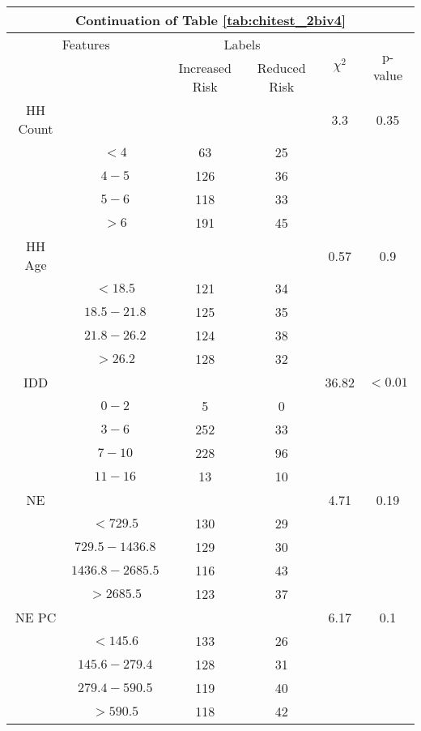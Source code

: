 \begin{table}
\centering
\label{tab:chitest_2biv4_cont}
\begin{tabular}{c c | c c| c | c}
\hline
\multicolumn{6}{c}{Continuation of Table \ref{tab:chitest_2biv4}}\\ 
\hline
\multicolumn{2}{c|}{Features}& \multicolumn{2}{c|}{Labels}& \multirow{2}{*}{$\chi^2$} & \multirow{2}{*}{p-value}\\ 
& & Increased Risk & Reduced Risk & & \\ 
\hline
HH Count &  &  & & 3.3 & 0.35 \\ 
& $< 4$ & 63 & 25& & \\ 
& $4-5$ & 126 & 36& & \\ 
& $5-6$ & 118 & 33& & \\ 
& $> 6$ & 191 & 45& & \\ 
\hline 
HH Age &  &  & & 0.57 & 0.9 \\ 
& $< 18.5$ & 121 & 34& & \\ 
& $18.5-21.8$ & 125 & 35& & \\ 
& $21.8-26.2$ & 124 & 38& & \\ 
& $> 26.2$ & 128 & 32& & \\ 
\hline 
IDD &  &  & & 36.82 & $< 0.01$ \\ 
& $0-2$ & 5 & 0& & \\ 
& $3-6$ & 252 & 33& & \\ 
& $7-10$ & 228 & 96& & \\ 
& $11-16$ & 13 & 10& & \\ 
\hline 
NE &  &  & & 4.71 & 0.19 \\ 
& $< 729.5$ & 130 & 29& & \\ 
& $729.5-1436.8$ & 129 & 30& & \\ 
& $1436.8-2685.5$ & 116 & 43& & \\ 
& $> 2685.5$ & 123 & 37& & \\ 
\hline 
NE PC &  &  & & 6.17 & 0.1 \\ 
& $< 145.6$ & 133 & 26& & \\ 
& $145.6-279.4$ & 128 & 31& & \\ 
& $279.4-590.5$ & 119 & 40& & \\ 
& $> 590.5$ & 118 & 42& & \\ 
\hline 
\end{tabular}
\end{table}

